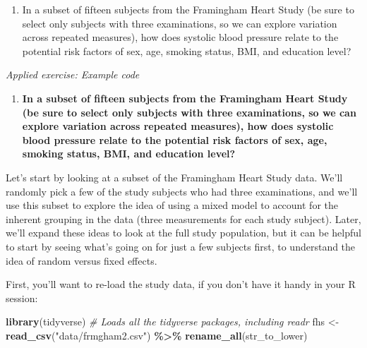 \documentclass[
]{book}
\newenvironment{Shaded}{\begin{snugshade}}{\end{snugshade}}
\newcommand{\CommentTok}[1]{\textcolor[rgb]{0.56,0.35,0.01}{\textit{#1}}}
\newcommand{\FunctionTok}[1]{\textcolor[rgb]{0.13,0.29,0.53}{\textbf{#1}}}
\newcommand{\NormalTok}[1]{#1}
\newcommand{\OtherTok}[1]{\textcolor[rgb]{0.56,0.35,0.01}{#1}}
\newcommand{\SpecialCharTok}[1]{\textcolor[rgb]{0.81,0.36,0.00}{\textbf{#1}}}
\newcommand{\StringTok}[1]{\textcolor[rgb]{0.31,0.60,0.02}{#1}}
\providecommand{\tightlist}{%
  \setlength{\itemsep}{0pt}\setlength{\parskip}{0pt}}
\begin{document}
\begin{enumerate}
\def\labelenumi{\arabic{enumi}.}
\tightlist
\item
  In a subset of fifteen subjects from the Framingham Heart Study (be sure
  to select only subjects with three examinations, so we can explore variation
  across repeated measures), how does systolic blood pressure relate to the
  potential risk factors of sex, age, smoking status, BMI, and education level?
\end{enumerate}

\emph{Applied exercise: Example code}

\begin{enumerate}
\def\labelenumi{\arabic{enumi}.}
\tightlist
\item
  \textbf{In a subset of fifteen subjects from the Framingham Heart Study (be sure
  to select only subjects with three examinations, so we can explore variation
  across repeated measures), how does systolic blood pressure relate to the
  potential risk factors of sex, age, smoking status, BMI, and education level?}
\end{enumerate}

Let's start by looking at a subset of the Framingham Heart Study data. We'll
randomly pick a few of the study subjects who had three examinations, and
we'll use this subset to explore the idea of using a mixed model to account
for the inherent grouping in the data (three measurements for each study
subject). Later, we'll expand these ideas to look at the full study population,
but it can be helpful to start by seeing what's going on for just a few subjects
first, to understand the idea of random versus fixed effects.

First, you'll want to re-load the study data, if you don't have it handy in
your R session:

\begin{Shaded}
\begin{Highlighting}[]
\FunctionTok{library}\NormalTok{(tidyverse) }\CommentTok{\# Loads all the tidyverse packages, including readr}
\NormalTok{fhs }\OtherTok{\textless{}{-}} \FunctionTok{read\_csv}\NormalTok{(}\StringTok{"data/frmgham2.csv"}\NormalTok{) }\SpecialCharTok{\%\textgreater{}\%} 
  \FunctionTok{rename\_all}\NormalTok{(str\_to\_lower)}
\end{Highlighting}
\end{Shaded}
\end{document}
